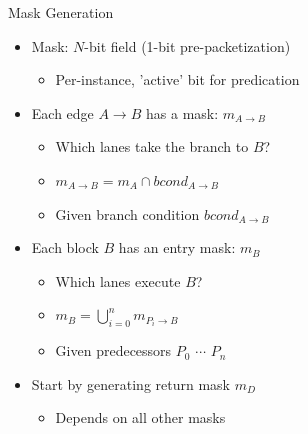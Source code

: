 \begin{frame}{Mask Generation}

\begin{minipage}[t]{0.51\linewidth}

\begin{itemize}
    \item Mask: $N$-bit field (1-bit pre-packetization)
    \begin{itemize}
        \item Per-instance, 'active' bit for predication
    \end{itemize}
    \item Each edge $A \rightarrow B$ has a mask: $m_{A \rightarrow B}$
    \begin{itemize}
        \item Which lanes take the branch to $B$?
        \item $m_{A \rightarrow B} = m_A \cap bcond_{A \rightarrow B}$
        \item Given branch condition $bcond_{A \rightarrow B}$
    \end{itemize}
    \item Each block $B$ has an entry mask: $m_B$
    \begin{itemize}
        \item Which lanes execute $B$?
        \item $m_B = \bigcup\limits_{i=0}^n  m_{P_i \rightarrow B}$
        \item Given predecessors $P_0$ $\cdots$ $P_n$
    \end{itemize}
    \item Start by generating return mask $m_D$
    \begin{itemize}
        \item Depends on all other masks
    \end{itemize}
\end{itemize}

\end{minipage}
\hspace{1em}
\begin{minipage}[t]{0.43\linewidth}


\end{minipage}
\end{frame}
